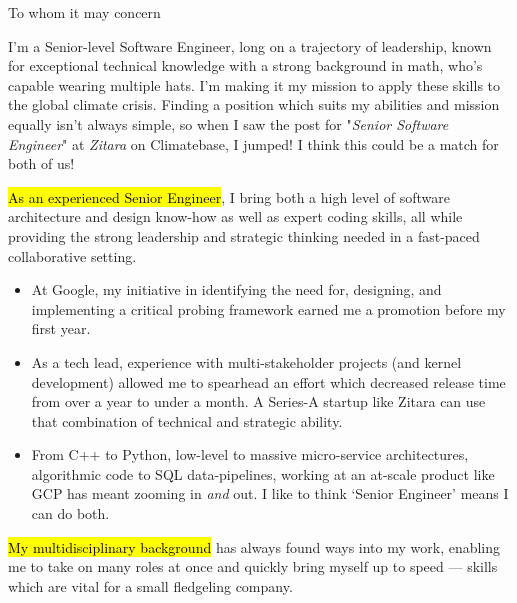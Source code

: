 \documentclass{tc_cv}
\begin{document}

\begin{adjustwidth}{38pt}{38pt}

  To whom it may concern\par \bigskip

  I'm a Senior-level Software Engineer, long on a trajectory of leadership,
  known for exceptional technical knowledge with a strong background in math,
  who's capable wearing multiple hats. I'm making it my mission to apply these
  skills to the global climate crisis. Finding a position which suits my
  abilities and mission equally isn't always simple, so when I saw the post for
  "\emph{Senior Software Engineer}" at \emph{Zitara} on Climatebase, I jumped!
  I think this could be a match for both of us! \medskip

  \hl{As an experienced Senior Engineer}, I bring both a high level of software
  architecture and design know-how as well as expert coding skills, all while
  providing the strong leadership and strategic thinking needed in a fast-paced
  collaborative setting.
  \begin{itemize}

    \item At Google, my initiative in identifying the need for, designing, and
      implementing a critical probing framework earned me a promotion before my
      first year.

    \item As a tech lead, experience with multi-stakeholder projects (and
      kernel development) allowed me to spearhead an effort which decreased
      release time from over a year to under a month. A Series-A startup like
      Zitara can use that combination of technical and strategic ability.

    \item From C++ to Python, low-level to massive micro-service architectures,
      algorithmic code to SQL data-pipelines, working at an at-scale product
      like GCP has meant zooming in \emph{and} out. I like to think `Senior
      Engineer' means I can do both.

  \end{itemize} \medskip

  \hl{My multidisciplinary background} has always found ways into my work,
  enabling me to take on many roles at once and quickly bring myself up to
  speed --- skills which are vital for a small fledgeling company.
  \begin{itemize}


\end{itemize}
\end{adjustwidth}
\end{document}
